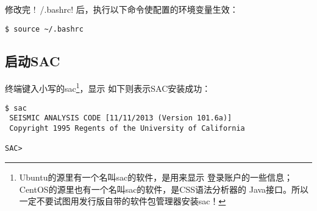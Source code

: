 修改完 !~/.bashrc! 后，执行以下命令使配置的环境变量生效：
\begin{verbatim}
$ source ~/.bashrc
\end{verbatim}

\subsection{启动SAC}
终端键入小写的sac\footnote{Ubuntu的源里有一个名叫sac的软件，是用来显示
登录账户的一些信息；CentOS的源里也有一个名叫sac的软件，是CSS语法分析器的
Java接口。所以一定不要试图用发行版自带的软件包管理器安装sac！}，显示
如下则表示SAC安装成功：
\begin{verbatim}
$ sac
 SEISMIC ANALYSIS CODE [11/11/2013 (Version 101.6a)]
 Copyright 1995 Regents of the University of California

SAC>
\end{verbatim}
